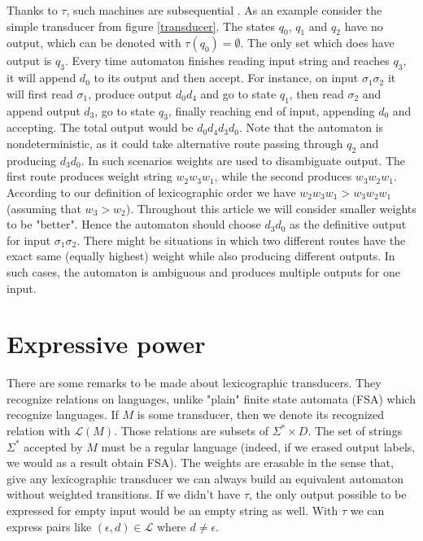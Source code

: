 Thanks to $\tau$, such machines are subsequential \cite{MOHRI}\cite{MOHRI2}\cite{HANSAN}\cite{de_la_higuera}. As an example consider the simple transducer from figure \ref{transducer}. The states $q_0$, $q_1$ and $q_2$ have no output, which can be denoted with $\tau(q_0)=\emptyset$. The only set which does have output is $q_3$. Every time automaton finishes reading input string and reaches $q_3$, it will append $d_0$ to its output and then accept. For instance, on input $\sigma_1\sigma_2$ it will first read $\sigma_1$, produce output $d_0d_4$ and go to state $q_1$, then read $\sigma_2$ and append output $d_3$, go to state $q_3$, finally reaching end of input, appending $d_0$ and accepting. The total output would be $d_0d_4d_3d_0$. Note that the automaton is nondeterministic, as it could take alternative route passing through $q_2$ and producing $d_3d_0$. In such scenarios weights are used to disambiguate output. The first route produces weight string $w_2w_3w_1$, while the second produces $w_3w_2w_1$. According to our definition of lexicographic order we have $w_2w_3w_1 > w_3w_2w_1$ (assuming that $w_3>w_2$). Throughout this article we will consider smaller weights to be "better". Hence the automaton should choose $d_3d_0$ as the definitive output for input $\sigma_1\sigma_2$. There might be situations in which two different routes have the exact same (equally highest) weight while also producing different outputs. In such cases, the automaton is ambiguous and produces multiple outputs for one input.



\section{Expressive power}

There are some remarks to be made about lexicographic transducers.  They recognize relations on languages, unlike "plain" finite state automata (FSA) which recognize languages. If $M$ is some transducer, then we denote its recognized relation with $\mathcal{L}(M)$. Those relations are subsets of $\Sigma^*\times D$. The set of strings $\Sigma^*$ accepted by $M$ must be a regular language (indeed, if we erased output labels, we would as a result obtain FSA). The weights are erasable \cite{MendozaDrosik2020MultitapeAA}  in the sense that, give any lexicographic transducer we can always build an equivalent automaton without weighted transitions. If we didn't have $\tau$, the only output possible to be expressed for empty input would be an empty string as well. With $\tau$ we can express pairs like $(\epsilon,d)\in\mathcal{L}$ where $d\ne\epsilon$.  

